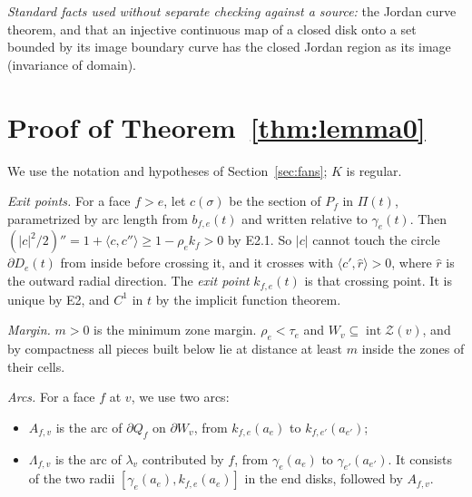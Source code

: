 \documentclass[preprint,12pt]{elsarticle}
\theoremstyle{definition}
\theoremstyle{remark}
\newcommand{\Z}{\mathcal{Z}}
\newcommand{\inter}{\operatorname{int}}
\begin{document}
\emph{Standard facts used without separate checking against a source:} the Jordan curve theorem, and that an injective
continuous map of a closed disk onto a set bounded by its image boundary curve has the closed Jordan region as its
image (invariance of domain).

\section{Proof of Theorem~\ref{thm:lemma0}}\label{sec:proof51}

We use the notation and hypotheses of Section~\ref{sec:fans}; $K$ is regular.

\emph{Exit points.} For a face $f>e$, let $c(\sigma)$ be the section of $P_f$ in $\Pi(t)$, parametrized by arc length
from $b_{f,e}(t)$ and written relative to $\gamma_e(t)$. Then $(|c|^2/2)''=1+\langle c,c''\rangle\ge1-\rho_ek_f>0$ by
E2.1. So $|c|$ cannot touch the circle $\partial D_e(t)$ from inside before crossing it, and it crosses with
$\langle c',\hat r\rangle>0$, where $\hat r$ is the outward radial direction. The \emph{exit point} $k_{f,e}(t)$ is that
crossing point. It is unique by E2, and $C^1$ in $t$ by the implicit function theorem.

\emph{Margin.} $m>0$ is the minimum zone margin. $\rho_e<\tau_e$ and $W_v\subseteq\inter\Z(v)$, and by compactness all
pieces built below lie at distance at least $m$ inside the zones of their cells.

\emph{Arcs.} For a face $f$ at $v$, we use two arcs:
\begin{itemize}
\item $A_{f,v}$ is the arc of $\partial Q_f$ on $\partial W_v$, from $k_{f,e}(a_e)$ to $k_{f,e'}(a_{e'})$;
\item $\Lambda_{f,v}$ is the arc of $\lambda_v$ contributed by $f$, from $\gamma_e(a_e)$ to $\gamma_{e'}(a_{e'})$. It
consists of the two radii $[\gamma_e(a_e),k_{f,e}(a_e)]$ in the end disks, followed by $A_{f,v}$.
\end{itemize}
\end{document}
